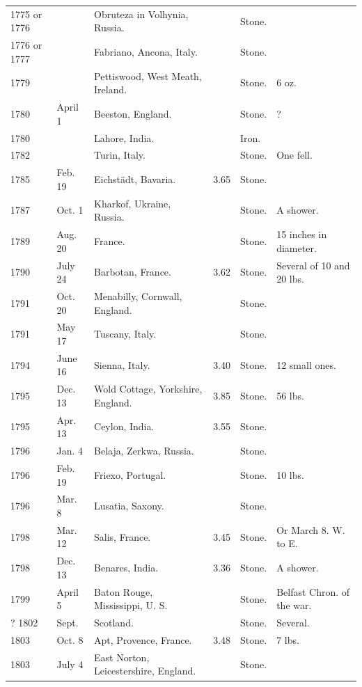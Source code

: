 \documentclass[a4paper, 12pt, oneside]{article}
\begin{document}
\begin{center}
\begin{longtable}{|p{10mm}|p{15mm}|p{32mm}|p{13mm}|p{13mm}|p{26mm}|}
        1775 or 1776 & ~ & Obruteza in Volhynia, Russia. & ~ & Stone. & ~ \\
        1776 or 1777 & ~ & Fabriano, Ancona, Italy. & ~ & Stone. & ~ \\
        1779 & ~ & Pettiswood, West Meath, Ireland. & ~ & Stone. & 6 oz. \\
        1780 & April 1 & Beeston, England. & ~ & Stone. & ? \\
        1780 & ~ & Lahore, India. & ~ & Iron. & ~ \\
        1782 & ~ & Turin, Italy. & ~ & Stone. & One fell. \\
        1785 & Feb. 19 & Eichstädt, Bavaria. & 3.65 & Stone. & ~ \\
        1787 & Oct. 1 & Kharkof, Ukraine, Russia. & ~ & Stone. & A shower. \\
        1789 & Aug. 20 & France. & ~ & Stone. & 15 inches in diameter. \\
        1790 & July 24 & Barbotan, France. & 3.62 & Stone. & Several of 10 and 20 lbs. \\
        1791 & Oct. 20 & Menabilly, Cornwall, England. & ~ & Stone. & ~ \\
        1791 & May 17 & Tuscany, Italy. & ~ & Stone. & ~ \\
        1794 & June 16 & Sienna, Italy. & 3.40 & Stone. & 12 small ones. \\
        1795 & Dec. 13 & Wold Cottage, Yorkshire, England. & 3.85 & Stone. & 56 lbs. \\
        1795 & Apr. 13 & Ceylon, India. & 3.55 & Stone. & ~ \\
        1796 & Jan. 4 & Belaja, Zerkwa, Russia. & ~ & Stone. & ~ \\
        1796 & Feb. 19 & Friexo, Portugal. & ~ & Stone. & 10 lbs. \\
        1796 & Mar. 8 & Lusatia, Saxony. & ~ & Stone. & ~ \\
        1798 & Mar. 12 & Salis, France. & 3.45 & Stone. & Or March 8. W. to E. \\
        1798 & Dec. 13 & Benares, India. & 3.36 & Stone. & A shower. \\
        1799 & April 5 & Baton Rouge, Mississippi, U. S. & ~ & Stone. & Belfast Chron. of the war. \\
        ? 1802 & Sept. & Scotland. & ~ & Stone. & Several. \\
        1803 & Oct. 8 & Apt, Provence, France. & 3.48 & Stone. & 7 lbs. \\
        1803 & July 4 & East Norton, Leicestershire, England. & ~ & Stone. & ~ \\

\end{longtable}
\end{center}
\end{document}
